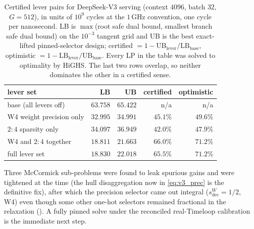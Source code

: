 \begin{table}[t]
\centering
\small
\begin{tabular}{lrrrr}
\toprule
lever set & LB & UB & certified & optimistic \\
\midrule
base (all levers off) & $63.758$ & $65.422$ & n/a & n/a \\
W4 weight precision only & $32.995$ & $34.991$ & $45.1\%$ & $49.6\%$ \\
$2{:}4$ sparsity only & $34.097$ & $36.949$ & $42.0\%$ & $47.9\%$ \\
W4 and $2{:}4$ together & $18.811$ & $21.663$ & $66.0\%$ & $71.2\%$ \\
full lever set & $18.830$ & $22.018$ & $65.5\%$ & $71.2\%$ \\
\bottomrule
\end{tabular}
\caption{Certified lever pairs for DeepSeek-V3 serving (context $4096$, batch
$32$, $G=512$), in units of $10^{9}$ cycles at the $1$\,GHz convention, one
cycle per nanosecond. LB is
$\max$(root safe dual bound, smallest branch safe dual bound) on the $10^{-3}$
tangent grid and UB is the best exact-lifted pinned-selector design; certified
$=1-\mathrm{UB}_{\mathrm{lever}}/\mathrm{LB}_{\mathrm{base}}$, optimistic
$=1-\mathrm{LB}_{\mathrm{lever}}/\mathrm{UB}_{\mathrm{base}}$. Every LP in
the table was solved to optimality by HiGHS. The last two rows overlap, so
neither dominates the other in a certified sense.}
\label{tab:lever_pairs}
\end{table} Three
McCormick sub-problems were found to leak spurious gains
and were tightened at the time (the hull disaggregation now in
\eqref{eq:v3_prec} is the definitive fix), after which the precision selector
came out integral ($s^W_{\mathrm{dec}}=1/2$, W4) even though some other one-hot
selectors remained fractional in the relaxation
(). A fully pinned solve
under the reconciled real-Timeloop calibration is the immediate next step.

